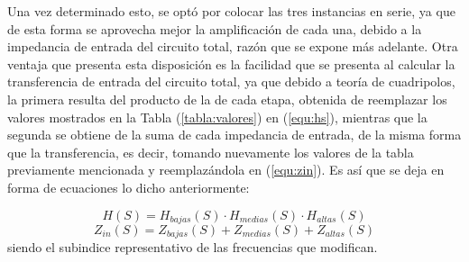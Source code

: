 \documentclass[a4paper]{article}
\begin{document}
Una vez determinado esto, se optó por colocar las tres instancias en serie, ya que de esta forma se aprovecha mejor la amplificación de cada una, debido a la impedancia de entrada del circuito total, razón que se expone más adelante. Otra ventaja que presenta esta disposición es la facilidad que se presenta al calcular la transferencia de entrada del circuito total, ya que debido a teoría de cuadripolos, la primera resulta del producto de la de cada etapa, obtenida de reemplazar los valores mostrados en la Tabla (\ref{tabla:valores}) en (\ref{equ:hs}), mientras que la segunda se obtiene de la suma de cada impedancia de entrada, de la misma forma que la transferencia, es decir, tomando nuevamente los valores de la tabla previamente mencionada y reemplazándola en (\ref{equ:zin}). Es así que se deja en forma de ecuaciones lo dicho anteriormente:

\begin{equation}
	H(S) = H_{bajas}(S) \cdot H_{medias}(S) \cdot H_{altas}(S)
\end{equation}
\begin{equation}
	Z_{in}(S) = Z_{bajas}(S) + Z_{medias}(S) + Z_{altas}(S)
\end{equation}
siendo el subindice representativo de las frecuencias que modifican.
\end{document}
